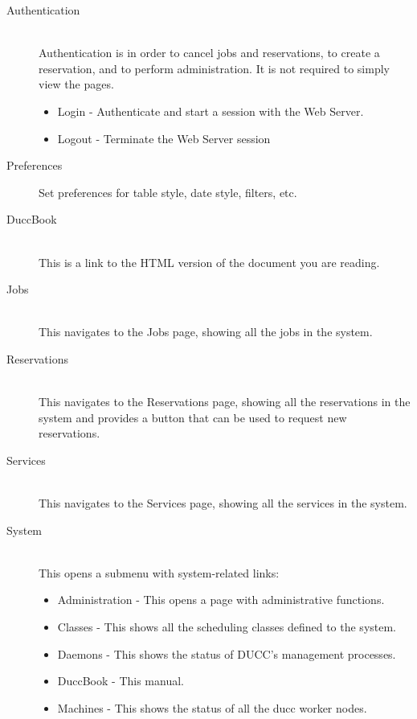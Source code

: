         \begin{description}
          \item[Authentication] \hfill \\ 
            Authentication is in order to cancel jobs and reservations, to create a
            reservation, and to perform administration. It is not required to simply view the pages.

            \begin{itemize}
              \item Login - Authenticate and start a session with the Web Server.             
              \item Logout - Terminate the Web Server session 
            \end{itemize}

          \item[Preferences]
            Set preferences for table style, date style, filters, etc.
            
          \item[DuccBook] \hfill \\
            This is a link to the HTML version of the document you are reading.

          \item[Jobs] \hfill \\
            This navigates to the Jobs page, showing all the jobs in the system.

          \item[Reservations] \hfill \\
            This navigates to the Reservations page, showing all the reservations
            in the system and provides a button that can be used to request new reservations. 

          \item[Services] \hfill \\
            This navigates to the Services page, showing all the services in the
            system.

          \item[System] \hfill \\
            This opens a submenu with system-related links:
            \begin{itemize}
              \item[] Administration - This opens a page with administrative functions. 
              \item[] Classes - This shows all the scheduling classes defined to the system. 
              \item[] Daemons - This shows the status of DUCC's management processes. 
              \item[] DuccBook - This manual. 
              \item[] Machines - This shows the status of all the ducc worker nodes. 
            \end{itemize}
      \end{description}              


